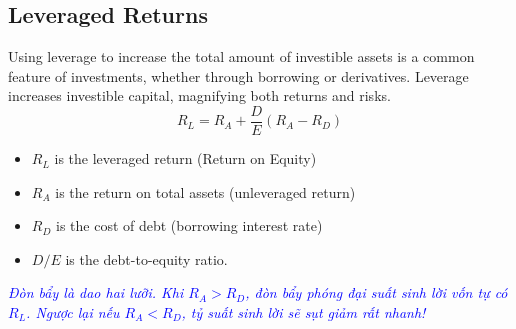 
\subsection{Leveraged Returns}
	\label{subsec:Leveraged Returns}
Using leverage to increase the total amount of investible assets is a common feature of investments, whether through borrowing or derivatives.
Leverage increases investible capital, magnifying both returns and risks.
\begin{equation}
	R_L = R_A + \frac{D}{E}(R_A - R_D)
	\label{eq:leveraged_return}
\end{equation}
\begin{itemize}
	\item[] $R_L$ is the leveraged return (Return on Equity)
	\item[] $R_A$ is the return on total assets (unleveraged return)
	\item[] $R_D$ is the cost of debt (borrowing interest rate)
	\item[] $D/E$ is the debt-to-equity ratio.
\end{itemize}

\textcolor{blue}{\textit{Đòn bẩy là dao hai lưỡi. Khi $R_A > R_D$, đòn bẩy phóng đại suất sinh lời vốn tự có $R_L$. Ngược lại nếu $R_A < R_D$, tỷ suất sinh lời sẽ sụt giảm rất nhanh!}}




